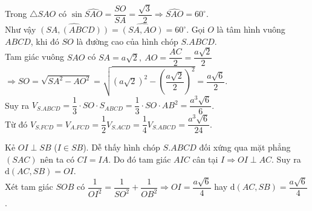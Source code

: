 \begin{ex}
{\begin{itemchoice}
			Trong $\triangle SAO$ có $\sin\widehat{SAO}=\dfrac{SO}{SA}=\dfrac{\sqrt{3}}{2} \Rightarrow \widehat{SAO}=60^\circ$. \\
			Như vậy $\widehat{(SA,(ABCD))}=\widehat{(SA, AO)}=60^\circ$.
			\itemch Gọi $O$ là tâm hình vuông $ABCD$, khi đó $SO$ là đường cao của hình chóp $S.ABCD$. \\
			Tam giác vuông $SAO$ có $SA=a \sqrt{2},\ AO=\dfrac{AC}{2}=\dfrac{a \sqrt{2}}{2}$ \\
			$\Rightarrow SO=\sqrt{SA^2 - AO^2}=\sqrt{\left( a \sqrt{2} \right)^2 - \left( \dfrac{a \sqrt{2}}{2} \right)^2}=\dfrac{a \sqrt{6}}{2}.$ \\
			Suy ra $V_{S.ABCD}=\dfrac{1}{3} \cdot SO \cdot S_{ABCD}
			=\dfrac{1}{3} \cdot SO \cdot AB^2=\dfrac{a^3\sqrt{6}}{6}$. \\
			Từ đó $V_{S.FCD}=V_{A.FCD}=\dfrac{1}{2}V_{S.ACD}
			=\dfrac{1}{4}V_{S.ABCD}
			=\dfrac{a^3\sqrt{6}}{24}$.
			
			\itemch Kẻ $OI \perp SB$ ($I \in SB$). Dễ thấy hình chóp $S.ABCD$ đối xứng qua mặt phẳng $(SAC)$ nên ta có $CI=IA$. Do đó tam giác $AIC$ cân tại $I \Rightarrow OI \perp AC$. Suy ra $\mathrm{d}(AC, SB)=OI$. \\
			Xét tam giác $SOB$ có $\dfrac{1}{OI^2}=\dfrac{1}{SO^2}+\dfrac{1}{OB^2} 
			\Rightarrow OI=\dfrac{a \sqrt{6}}{4}$ hay $\mathrm{d}(AC, SB)=\dfrac{a \sqrt{6}}{4}$.
		\end{itemchoice}
	}
\end{ex}

